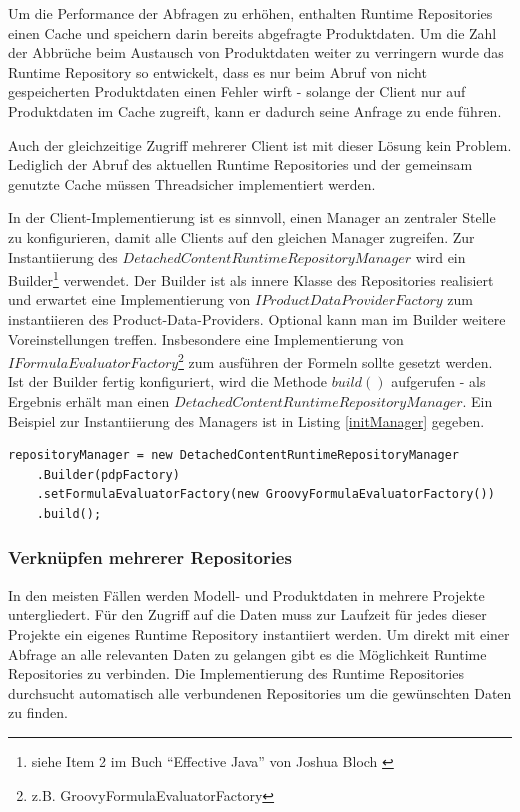 \documentclass[headsepline=true, footsepline=true]{scrartcl}
\begin{document}
Um die Performance der Abfragen zu erhöhen, enthalten Runtime Repositories einen
Cache und speichern darin bereits abgefragte Produktdaten. Um die Zahl der
Abbrüche beim Austausch von Produktdaten weiter zu verringern wurde das Runtime
Repository so entwickelt, dass es nur beim Abruf von nicht gespeicherten
Produktdaten einen Fehler wirft - solange der Client nur auf Produktdaten im
Cache zugreift, kann er dadurch seine Anfrage zu ende führen.

Auch der gleichzeitige Zugriff mehrerer Client ist mit dieser Lösung kein
Problem. Lediglich der Abruf des aktuellen Runtime Repositories und der gemeinsam
genutzte Cache müssen Threadsicher implementiert werden.

In der Client-Implementierung ist es sinnvoll, einen Manager an zentraler Stelle
zu konfigurieren, damit alle Clients auf den gleichen Manager zugreifen. Zur
Instantiierung des $DetachedContentRuntimeRepositoryManager$ wird ein
Builder\footnote{siehe Item 2 im Buch "`Effective Java"' von Joshua Bloch 
\cite{effectiveJava}} verwendet. Der Builder ist als innere Klasse des
Repositories realisiert und erwartet eine Implementierung von
$IProductDataProviderFactory$ zum instantiieren des Product-Data-Providers.
Optional kann man im Builder weitere Voreinstellungen treffen.
Insbesondere eine Implementierung von $IFormulaEvaluatorFactory$\footnote{z.B.
GroovyFormulaEvaluatorFactory} zum ausführen der Formeln sollte gesetzt werden.
Ist der Builder fertig konfiguriert, wird die Methode $build()$ aufgerufen - als
Ergebnis erhält man einen $DetachedContentRuntimeRepositoryManager$. Ein
Beispiel zur Instantiierung des Managers ist in Listing \ref{initManager}
gegeben.

\begin{lstlisting}[caption=Initialize DetachedContentRuntimeRepositoryManager,
label=initManager]
repositoryManager = new DetachedContentRuntimeRepositoryManager
	.Builder(pdpFactory)
	.setFormulaEvaluatorFactory(new GroovyFormulaEvaluatorFactory())
	.build();
\end{lstlisting}

\subsubsection{Verknüpfen mehrerer Repositories}

In den meisten Fällen werden Modell- und Produktdaten in mehrere Projekte
untergliedert. Für den Zugriff auf die Daten muss zur Laufzeit für jedes dieser
Projekte ein eigenes Runtime Repository instantiiert werden. Um direkt mit einer
Abfrage an alle relevanten Daten zu gelangen gibt es die Möglichkeit Runtime
Repositories zu verbinden. Die Implementierung des Runtime Repositories
durchsucht automatisch alle verbundenen Repositories um die gewünschten Daten zu
finden.
\end{document}

